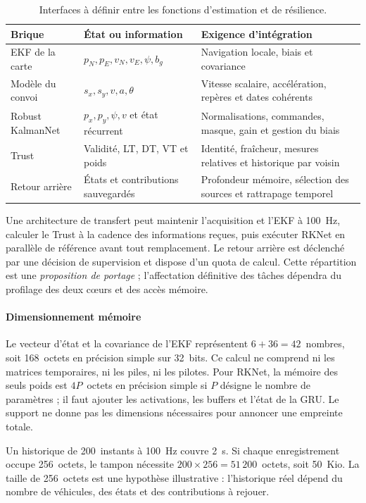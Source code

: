 \begin{table}[!htbp]\centering\small
\begin{tabularx}{\linewidth}{|L{3.0cm}|L{4.8cm}|Y|}\hline
{}\textbf{Brique} & \textbf{État ou information} & \textbf{Exigence d'intégration}\\\hline
EKF de la carte & $p_N,p_E,v_N,v_E,\psi,b_g$ & Navigation locale, biais et covariance\\\hline
Modèle du convoi & $s_x,s_y,v,a,\theta$ & Vitesse scalaire, accélération, repères et dates cohérents\\\hline
Robust KalmanNet & $p_x,p_y,\psi,v$ et état récurrent & Normalisations, commandes, masque, gain et gestion du biais\\\hline
Trust & Validité, LT, DT, VT et poids & Identité, fraîcheur, mesures relatives et historique par voisin\\\hline
Retour arrière & États et contributions sauvegardés & Profondeur mémoire, sélection des sources et rattrapage temporel\\\hline
\end{tabularx}
\caption{Interfaces à définir entre les fonctions d'estimation et de résilience.}
\end{table}

Une architecture de transfert peut maintenir l'acquisition et l'EKF à 100~Hz, calculer le Trust à la cadence des informations reçues, puis exécuter RKNet en parallèle de référence avant tout remplacement. Le retour arrière est déclenché par une décision de supervision et dispose d'un quota de calcul. Cette répartition est une \emph{proposition de portage} ; l'affectation définitive des tâches dépendra du profilage des deux cœurs et des accès mémoire.

\paragraph{Dimensionnement mémoire}
Le vecteur d'état et la covariance de l'EKF représentent $6+36=42$~nombres, soit 168~octets en précision simple sur 32~bits. Ce calcul ne comprend ni les matrices temporaires, ni les piles, ni les pilotes. Pour RKNet, la mémoire des seuls poids est $4P$~octets en précision simple si $P$ désigne le nombre de paramètres ; il faut ajouter les activations, les buffers et l'état de la GRU. Le support ne donne pas les dimensions nécessaires pour annoncer une empreinte totale.

 Un historique de 200~instants à 100~Hz couvre 2~s. Si chaque enregistrement occupe 256~octets, le tampon nécessite $200\times256=51\,200$~octets, soit 50~Kio. La taille de 256~octets est une hypothèse illustrative : l'historique réel dépend du nombre de véhicules, des états et des contributions à rejouer.

